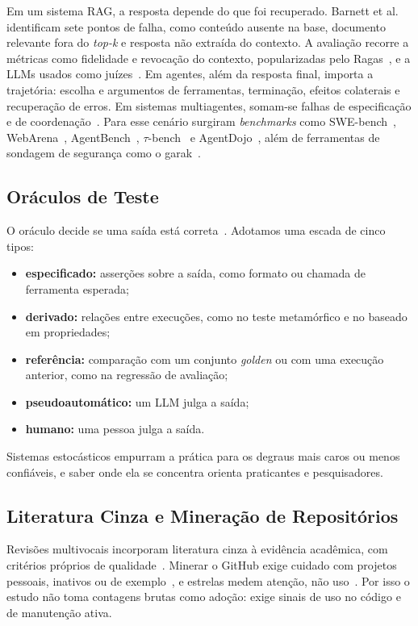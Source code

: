 \documentclass[sigconf]{acmart}
\begin{document}
Em um sistema RAG, a resposta depende do que foi recuperado. Barnett et al.~\cite{barnett2024seven} identificam sete pontos de falha, como conteúdo ausente na base, documento relevante fora do \textit{top-k} e resposta não extraída do contexto. A avaliação recorre a métricas como fidelidade e revocação do contexto, popularizadas pelo Ragas~\cite{es2024ragas}, e a LLMs usados como juízes~\cite{zheng2023judging}. Em agentes, além da resposta final, importa a trajetória: escolha e argumentos de ferramentas, terminação, efeitos colaterais e recuperação de erros. Em sistemas multiagentes, somam-se falhas de especificação e de coordenação~\cite{cemri2025multiagent}. Para esse cenário surgiram \textit{benchmarks} como SWE-bench~\cite{jimenez2024swebench}, WebArena~\cite{zhou2024webarena}, AgentBench~\cite{liu2024agentbench}, $\tau$-bench~\cite{yao2024taubench} e AgentDojo~\cite{debenedetti2024agentdojo}, além de ferramentas de sondagem de segurança como o garak~\cite{derczynski2024garak}.

\subsection{Oráculos de Teste}

O oráculo decide se uma saída está correta~\cite{barr2015oracle}. Adotamos uma escada de cinco tipos:
\begin{itemize}
  \item \textbf{especificado:} asserções sobre a saída, como formato ou chamada de ferramenta esperada;
  \item \textbf{derivado:} relações entre execuções, como no teste metamórfico e no baseado em propriedades;
  \item \textbf{referência:} comparação com um conjunto \textit{golden} ou com uma execução anterior, como na regressão de avaliação;
  \item \textbf{pseudoautomático:} um LLM julga a saída;
  \item \textbf{humano:} uma pessoa julga a saída.
\end{itemize}
Sistemas estocásticos empurram a prática para os degraus mais caros ou menos confiáveis, e saber onde ela se concentra orienta praticantes e pesquisadores.

\subsection{Literatura Cinza e Mineração de Repositórios}

Revisões multivocais incorporam literatura cinza à evidência acadêmica, com critérios próprios de qualidade~\cite{garousi2019guidelines}. Minerar o GitHub exige cuidado com projetos pessoais, inativos ou de exemplo~\cite{kalliamvakou2014promises}, e estrelas medem atenção, não uso~\cite{borges2018star}. Por isso o estudo não toma contagens brutas como adoção: exige sinais de uso no código e de manutenção ativa.
\end{document}
